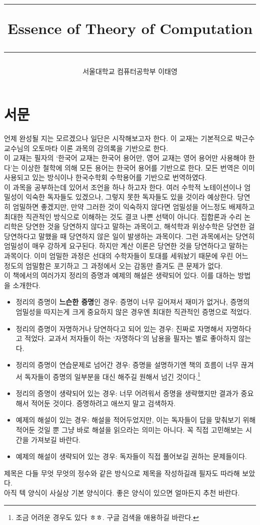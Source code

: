 \documentclass[b5paper, 11pt]{book}
\title{
    \hrule
    \vspace{0.5cm}
    \bfseries\huge Essence of Theory of Computation
    \vspace{0.5cm}
    \hrule}
\author{서울대학교 컴퓨터공학부 이태영}
\theoremstyle{definition}
\begin{document}
\maketitle
\chapter*{서문}
언제 완성될 지는 모르겠으나 일단은 시작해보고자 한다. 이 교재는 기본적으로 박근수 교수님의 오토마타 이론 과목의 강의록을 기반으로 한다. \\ 
이 교재는 필자의 `한국어 교재는 한국어 용어만, 영어 교재는 영어 용어만 사용해야 한다'는 이상한 철학에 의해 모든 용어는 한국어 용어를 기반으로 한다. 모든 번역은 이미 사용되고 있는 방식이나 한국수학회 수학용어를 기반으로 번역하였다. \\ 
이 과목을 공부하는데 있어서 조언을 하나 하고자 한다. 여러 수학적 노테이션이나 엄밀성이 익숙한 독자들도 있겠으나, 그렇지 못한 독자들도 있을 것이라 예상한다. 당연히 엄밀하면 좋겠지만, 만약 그러한 것이 익숙하지 않다면 엄밀성을 어느정도 배제하고 최대한 직관적인 방식으로 이해하는 것도 결코 나쁜 선택이 아니다. 집합론과 수리 논리학은 당연한 것을 당연하지 않다고 말하는 과목이고, 해석학과 위상수학은 당연한 걸 당연하다고 말했을 때 당연하지 않은 일이 발생하는 과목이다. 그런 과목에서는 당연히 엄밀성이 매우 강하게 요구된다. 하지만 계산 이론은 당연한 것을 당연하다고 말하는 과목이다. 이미 엄밀한 과정은 선대의 수학자들이 토대를 세워놨기 때문에 우린 어느 정도의 엄밀함은 포기하고 그 과정에서 오는 감동만 즐겨도 큰 문제가 없다. \\ 
이 책에서의 여러가지 정리의 증명과 예제의 해설은 생략되어 있다. 이를 대하는 방법을 소개한다.
\begin{itemize}
    \item 정리의 증명이 \textbf{느슨한 증명}인 경우: 증명이 너무 길어져서 재미가 없거나, 증명의 엄밀성을 따지는게 크게 중요하지 않은 경우엔 최대한 직관적인 증명으로 적었다.
    \item 정리의 증명이 자명하거나 당연하다고 되어 있는 경우: 진짜로 자명해서 자명하다고 적었다. 교과서 저자들이 하는 `자명하다'의 남용을 필자는 별로 좋아하지 않는다.
    \item 정리의 증명이 연습문제로 넘어간 경우: 증명을 설명하기엔 책의 흐름이 너무 끊겨서 독자들이 증명의 일부분을 대신 해주길 원해서 넘긴 것이다.\footnote{조금 어려운 경우도 있다 ㅎㅎ. 구글 검색을 애용하길 바란다.}
    \item 정리의 증명이 생략되어 있는 경우: 너무 어려워서 증명을 생략했지만 결과가 중요해서 적어둔 것이다. 증명하려고 애쓰지 말고 검색하자.
    \item 예제의 해설이 있는 경우: 해설을 적어두었지만, 이는 독자들이 답을 맞춰보기 위해 적어둔 것일 뿐 그냥 바로 해설을 읽으라는 의미는 아니다. 꼭 직접 고민해보는 시간을 가져보길 바란다.
    \item 예제의 해설이 생략되어 있는 경우: 독자들이 직접 풀어보길 권하는 문제들이다.
\end{itemize}
제목은 다들 무엇 무엇의 정수와 같은 방식으로 제목을 작성하길래 필자도 따라해 보았다. \\ 
아직 텍 양식이 사실상 기본 양식이다. 좋은 양식이 있으면 얼마든지 추천 바란다.
\tableofcontents
\end{document}
